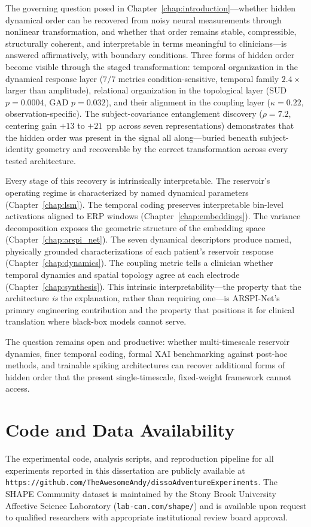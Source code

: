 The governing question posed in Chapter~\ref{chap:introduction}---whether hidden dynamical order can be recovered from noisy neural measurements through nonlinear transformation, and whether that order remains stable, compressible, structurally coherent, and interpretable in terms meaningful to clinicians---is answered affirmatively, with boundary conditions. Three forms of hidden order become visible through the staged transformation: temporal organization in the dynamical response layer ($7/7$ metrics condition-sensitive, temporal family $2.4\times$ larger than amplitude), relational organization in the topological layer (SUD $p = 0.0004$, GAD $p = 0.032$), and their alignment in the coupling layer ($\kappa = 0.22$, observation-specific). The subject-covariance entanglement discovery ($\rho = 7.2$, centering gain $+13$ to $+21$~pp across seven representations) demonstrates that the hidden order was present in the signal all along---buried beneath subject-identity geometry and recoverable by the correct transformation across every tested architecture.

Every stage of this recovery is intrinsically interpretable. The reservoir's operating regime is characterized by named dynamical parameters (Chapter~\ref{chap:lsm}). The temporal coding preserves interpretable bin-level activations aligned to ERP windows (Chapter~\ref{chap:embeddings}). The variance decomposition exposes the geometric structure of the embedding space (Chapter~\ref{chap:arspi_net}). The seven dynamical descriptors produce named, physically grounded characterizations of each patient's reservoir response (Chapter~\ref{chap:dynamics}). The coupling metric tells a clinician whether temporal dynamics and spatial topology agree at each electrode (Chapter~\ref{chap:synthesis}). This intrinsic interpretability---the property that the architecture \emph{is} the explanation, rather than requiring one---is ARSPI-Net's primary engineering contribution and the property that positions it for clinical translation where black-box models cannot serve.

The question remains open and productive: whether multi-timescale reservoir dynamics, finer temporal coding, formal XAI benchmarking against post-hoc methods, and trainable spiking architectures can recover additional forms of hidden order that the present single-timescale, fixed-weight framework cannot access.
\section{Code and Data Availability}

The experimental code, analysis scripts, and reproduction pipeline for all experiments reported in this dissertation are publicly available at \texttt{https://github.com/TheAwesomeAndy/dissoAdventureExperiments}. The SHAPE Community dataset is maintained by the Stony Brook University Affective Science Laboratory (\texttt{lab-can.com/shape/}) and is available upon request to qualified researchers with appropriate institutional review board approval.